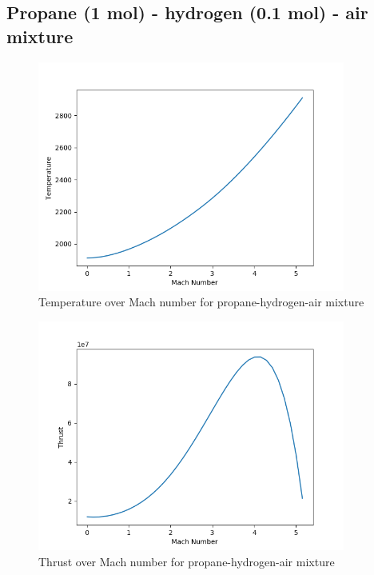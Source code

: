 \documentclass[a4paper,11pt]{article}
\begin{document}
\subsection{Propane (1 mol) - hydrogen (0.1 mol) - air mixture}
	\begin{figure}[H]
		\centering
       		\includegraphics[width=0.9\textwidth]{Propan(1mol)_wodor(0.1mol)_pow/Temperature_over_Mach.png}
       		\caption{Temperature over Mach number for propane-hydrogen-air mixture}
	\end{figure}
	\begin{figure}[H]
		\centering
		\includegraphics[width=0.9\textwidth]{Propan(1mol)_wodor(0.1mol)_pow/Thrust_over_Mach.png}
       		\caption{Thrust over Mach number for propane-hydrogen-air mixture}
	\end{figure}
\end{document}
